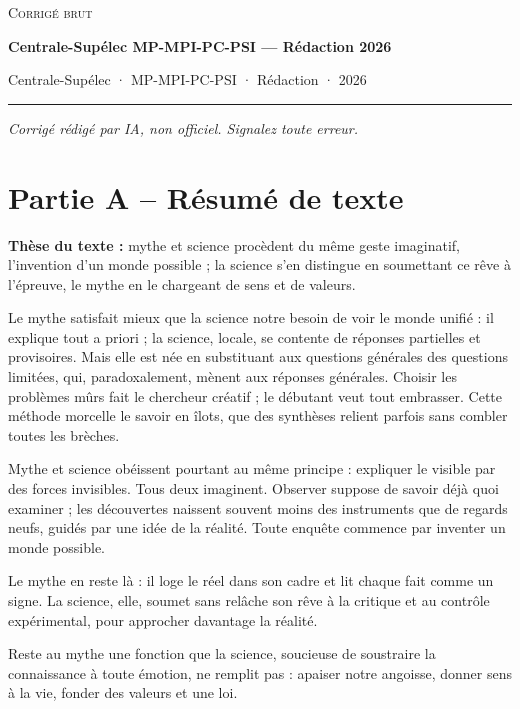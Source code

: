 \documentclass[11pt,a4paper]{article}
\begin{document}
\thispagestyle{plain}
\begin{center}
  {\small\scshape Corrigé brut}\par\smallskip
  {\LARGE\bfseries Centrale-Supélec MP-MPI-PC-PSI — Rédaction 2026\par}\medskip
  {\large Centrale-Supélec · MP-MPI-PC-PSI · Rédaction · 2026\par}
\end{center}
\vspace{2pt}\hrule\vspace{8pt}

\emph{Corrigé rédigé par IA, non officiel. Signalez toute erreur.}

\hypertarget{partie-a-ruxe9sumuxe9-de-texte}{%
\section{Partie A -- Résumé de texte}\label{partie-a-ruxe9sumuxe9-de-texte}}

\textbf{Thèse du texte :} mythe et science procèdent du même geste imaginatif, l'invention d'un monde possible ; la science s'en distingue en soumettant ce rêve à l'épreuve, le mythe en le chargeant de sens et de valeurs.

Le mythe satisfait mieux que la science notre besoin de voir le monde unifié : il explique tout a priori ; la science, locale, se contente de réponses partielles et provisoires. Mais elle est née en substituant aux questions générales des questions limitées, qui, paradoxalement, mènent aux réponses générales. Choisir les problèmes \textbar{} mûrs fait le chercheur créatif ; le débutant veut tout embrasser. Cette méthode morcelle le savoir en îlots, que des synthèses relient parfois sans combler toutes les brèches.

Mythe et science obéissent pourtant au même principe : expliquer le visible par des forces invisibles. Tous deux imaginent. Observer suppose de savoir déjà \textbar{} quoi examiner ; les découvertes naissent souvent moins des instruments que de regards neufs, guidés par une idée de la réalité. Toute enquête commence par inventer un monde possible.

Le mythe en reste là : il loge le réel dans son cadre et lit chaque fait comme un signe. La science, elle, \textbar{} soumet sans relâche son rêve à la critique et au contrôle expérimental, pour approcher davantage la réalité.

Reste au mythe une fonction que la science, soucieuse de soustraire la connaissance à toute émotion, ne remplit pas : apaiser notre angoisse, donner sens à la vie, fonder des valeurs et une loi. \textbar{}
\end{document}
